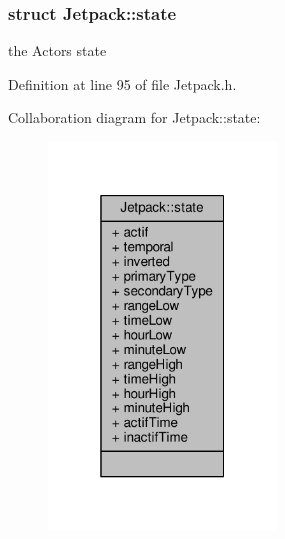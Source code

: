 \subsubsection{struct Jetpack\+:\+:state}
the Actor\textquotesingle{}s state 

Definition at line 95 of file Jetpack.\+h.



Collaboration diagram for Jetpack\+:\+:state\+:
\nopagebreak
\begin{figure}[H]
\begin{center}
\leavevmode
\includegraphics[width=172pt]{de/da1/struct_jetpack_1_1state__coll__graph}
\end{center}
\end{figure}
